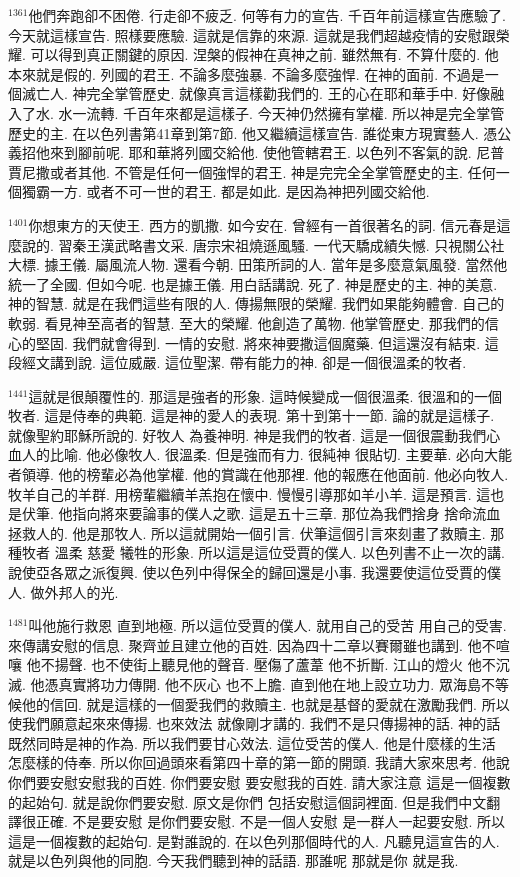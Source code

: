 \documentclass{book}
\begin{document}
$^{1361}$他們奔跑卻不困倦.
行走卻不疲乏.
何等有力的宣告.
千百年前這樣宣告應驗了.
今天就這樣宣告.
照樣要應驗.
這就是信靠的來源.
這就是我們超越疫情的安慰跟榮耀.
可以得到真正關鍵的原因.
涅槃的假神在真神之前.
雖然無有.
不算什麼的.
他本來就是假的.
列國的君王.
不論多麼強暴.
不論多麼強悍.
在神的面前.
不過是一個滅亡人.
神完全掌管歷史.
就像真言這樣勸我們的.
王的心在耶和華手中.
好像融入了水.
水一流轉.
千百年來都是這樣子.
今天神仍然擁有掌權.
所以神是完全掌管歷史的主.
在以色列書第41章到第7節.
他又繼續這樣宣告.
誰從東方現實藝人.
憑公義招他來到腳前呢.
耶和華將列國交給他.
使他管轄君王.
以色列不客氣的說.
尼普賈尼撒或者其他.
不管是任何一個強悍的君王.
神是完完全全掌管歷史的主.
任何一個獨霸一方.
或者不可一世的君王.
都是如此.
是因為神把列國交給他.

$^{1401}$你想東方的天使王.
西方的凱撒.
如今安在.
曾經有一首很著名的詞.
信元春是這麼說的.
習秦王漢武略書文采.
唐宗宋祖燒遜風騷.
一代天驕成績失憾.
只視關公社大標.
據王儀.
屬風流人物.
還看今朝.
田策所詞的人.
當年是多麼意氣風發.
當然他統一了全國.
但如今呢.
也是據王儀.
用白話講說.
死了.
神是歷史的主.
神的美意.
神的智慧.
就是在我們這些有限的人.
傳揚無限的榮耀.
我們如果能夠體會.
自己的軟弱.
看見神至高者的智慧.
至大的榮耀.
他創造了萬物.
他掌管歷史.
那我們的信心的堅固.
我們就會得到.
一情的安慰.
將來神要撒這個魔藥.
但這還沒有結束.
這段經文講到說.
這位威嚴.
這位聖潔.
帶有能力的神.
卻是一個很溫柔的牧者.

$^{1441}$這就是很顛覆性的.
那這是強者的形象.
這時候變成一個很溫柔.
很溫和的一個牧者.
這是侍奉的典範.
這是神的愛人的表現.
第十到第十一節.
論的就是這樣子.
就像聖約耶穌所說的.
好牧人 為養神明.
神是我們的牧者.
這是一個很震動我們心血人的比喻.
他必像牧人.
很溫柔.
但是強而有力.
很純神 很貼切.
主要華.
必向大能者領導.
他的榜輩必為他掌權.
他的賞識在他那裡.
他的報應在他面前.
他必向牧人.
牧羊自己的羊群.
用榜輩繼續羊羔抱在懷中.
慢慢引導那如羊小羊.
這是預言.
這也是伏筆.
他指向將來要論事的僕人之歌.
這是五十三章.
那位為我們捨身 捨命流血 拯救人的.
他是那牧人.
所以這就開始一個引言.
伏筆這個引言來刻畫了救贖主.
那種牧者 溫柔 慈愛 犧牲的形象.
所以這是這位受賈的僕人.
以色列書不止一次的講.
說使亞各眾之派復興.
使以色列中得保全的歸回還是小事.
我還要使這位受賈的僕人.
做外邦人的光.

$^{1481}$叫他施行救恩 直到地極.
所以這位受賈的僕人.
就用自己的受苦 用自己的受害.
來傳講安慰的信息.
聚齊並且建立他的百姓.
因為四十二章以賽爾雖也講到.
他不喧嚷 他不揚聲.
也不使街上聽見他的聲音.
壓傷了蘆葦 他不折斷.
江山的燈火 他不沉滅.
他憑真實將功力傳開.
他不灰心 也不上膽.
直到他在地上設立功力.
眾海島不等候他的信回.
就是這樣的一個愛我們的救贖主.
也就是基督的愛就在激勵我們.
所以使我們願意起來來傳揚.
也來效法 就像剛才講的.
我們不是只傳揚神的話.
神的話既然同時是神的作為.
所以我們要甘心效法.
這位受苦的僕人.
他是什麼樣的生活 怎麼樣的侍奉.
所以你回過頭來看第四十章的第一節的開頭.
我請大家來思考.
他說你們要安慰安慰我的百姓.
你們要安慰 要安慰我的百姓.
請大家注意 這是一個複數的起始句.
就是說你們要安慰.
原文是你們 包括安慰這個詞裡面.
但是我們中文翻譯很正確.
不是要安慰 是你們要安慰.
不是一個人安慰 是一群人一起要安慰.
所以這是一個複數的起始句.
是對誰說的.
在以色列那個時代的人.
凡聽見這宣告的人.
就是以色列與他的同胞.
今天我們聽到神的話語.
那誰呢 那就是你 就是我.
\end{document}
